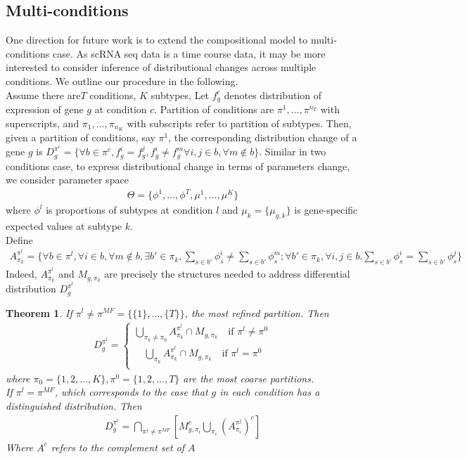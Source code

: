 \documentclass[11pt]{amsart}
\newtheorem{theorem}{Theorem}
\begin{document}
\subsection{Multi-conditions}
One direction for future work is to extend the compositional model to multi-conditions case. As scRNA seq data is a time course data, it may be more interested to  consider inference of distributional changes across multiple conditions.  We outline our procedure in the following.\\
Assume there are$T$ conditions, $K$ subtypes,  Let $f_g^c$ denotes distribution of expression of gene $g$ at condition $c$. Partition of conditions are $\pi^1,...,\pi^{n_T}$ with superscripts, and $\pi_1,...,\pi_{n_K}$ with subscripts refer to partition of subtypes. Then, given a partition of conditions, say $\pi^1$, the corresponding distribution change of a gene $g$ is $D_g^{\pi^c} = \{\forall b\in \pi^c, f_g^i = f_g^j, f_g^i \neq f_g^m \forall i,j \in b, \forall m \notin b \}$. Similar in two conditions case, to express distributional change in terms of parameters change, we consider parameter space 
\begin{eqnarray*}
\Theta = \{\phi^1, ..., \phi^T, \mu^1, ..., \mu^K\}
\end{eqnarray*}
where $\phi^l$ is proportions of subtypes at condition $l$ and $\mu_k = \{\mu_{g,k}\}$ is gene-specific expected values at subtype $k$. \\
Define
\begin{eqnarray*}
A_{\pi_k}^{\pi^l} = \{\forall b \in \pi^l, \forall i \in b, \forall m \notin b, \exists b' \in \pi_k, \underset{s\in b'}{\sum}\phi_s^i \neq \underset{s\in b'}\sum\phi_s^m;
\forall b' \in \pi_k, \forall i, j \in b. \underset{s\in b'}\sum\phi_s^i = \underset{s\in b'}\sum\phi_s^j\}
\end{eqnarray*}
Indeed, $A_{\pi_k}^{\pi^l}$ and $M_{g,\pi_k}$ are precisely the structures needed to address differential distribution $D_g^{\pi^l}$
\begin{theorem}
If $\pi^l \neq \pi^{MF} =  \{\{1\},...,\{T\}\}$, the most refined partition. Then
\begin{eqnarray*}
    D_g^{\pi^l} = \left\{
                \begin{array}{ll}
                 \underset{\pi_k \neq \pi_0}\bigcup A_{\pi_k}^{\pi^l}\cap M_{g,\pi_k} \quad \text{if } \pi^l \neq \pi^0 \\
                 \quad \underset{\pi_k}\bigcup A_{\pi_k}^{\pi^l}\cap M_{g,\pi_k}\quad \text{if } \pi^l = \pi^0\\             
                \end{array}
              \right.
\end{eqnarray*}
where $\pi_0 = \{1, 2, ..., K\}, \pi^0 = \{1, 2, ..., T\}$ are the most coarse partitions.\\
If $\pi^l = \pi^{MF}$, which corresponds to the case that $g$ in each condition has a distinguished distribution. Then
\begin{eqnarray*}
  D_g^{\pi^l} =  \underset{\pi^j\neq \pi^{MF}}\bigcap[M_{g,\pi_i}^c \underset{\pi_i}\bigcup (A_{\pi_i}^{\pi^j})^c]
\end{eqnarray*}
Where $A^c$ refers to the complement set of $A$
\end{theorem}
\end{document}
